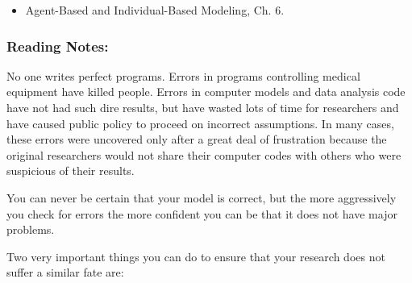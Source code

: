\documentclass[
]{article}
\providecommand{\tightlist}{%
  \setlength{\itemsep}{0pt}\setlength{\parskip}{0pt}}
\begin{document}
\begin{itemize}
\tightlist
\item
  Agent-Based and Individual-Based Modeling, Ch. 6.
\end{itemize}

\subsubsection{Reading Notes:}\label{reading-notes-5}

No one writes perfect programs. Errors in programs controlling medical
equipment have killed people. Errors in computer models and data
analysis code have not had such dire results, but have wasted lots of
time for researchers and have caused public policy to proceed on
incorrect assumptions. In many cases, these errors were uncovered only
after a great deal of frustration because the original researchers would
not share their computer codes with others who were suspicious of their
results.

You can never be certain that your model is correct, but the more
aggressively you check for errors the more confident you can be that it
does not have major problems.

Two very important things you can do to ensure that your research does
not suffer a similar fate are:
\end{document}
